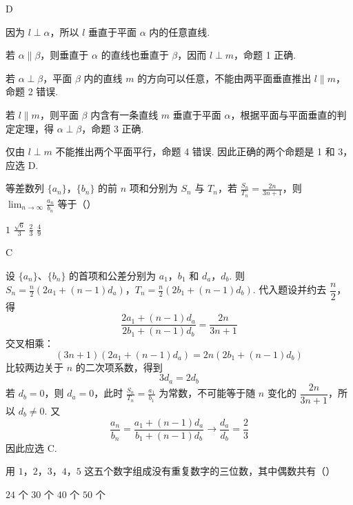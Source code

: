 \documentclass[UTF8,a4paper,oneside,11pt]{ctexbook}
\begin{document}
\begin{answer}
D
\end{answer}

\begin{solution}
因为 \(l\perp\alpha\)，所以 \(l\) 垂直于平面 \(\alpha\) 内的任意直线.

若 \(\alpha\parallel\beta\)，则垂直于 \(\alpha\) 的直线也垂直于 \(\beta\)，因而 \(l\perp m\)，命题 1 正确.

若 \(\alpha\perp\beta\)，平面 \(\beta\) 内的直线 \(m\) 的方向可以任意，不能由两平面垂直推出 \(l\parallel m\)，命题 2 错误.

若 \(l\parallel m\)，则平面 \(\beta\) 内含有一条直线 \(m\) 垂直于平面 \(\alpha\)，根据平面与平面垂直的判定定理，得 \(\alpha\perp\beta\)，命题 3 正确.

仅由 \(l\perp m\) 不能推出两个平面平行，命题 4 错误. 因此正确的两个命题是 1 和 3，应选 D.
\end{solution}

\begin{problem}
等差数列 \(\{a_{n}\}\)，\(\{b_{n}\}\) 的前 \(n\) 项和分别为 \(S_{n}\) 与 \(T_{n}\)，若 \(\frac{S_{n}}{T_{n}} = \frac{2n}{3n + 1}\)，则 \(\displaystyle\lim_{n\to \infty}\frac{a_n}{b_n}\) 等于（\quad）

\choices
    {\(1\)}
    {\(\frac{\sqrt{6}}{3} \)}
    {\(\frac{2}{3} \)}
    {\(\frac{4}{9} \)}
\end{problem}

\begin{answer}
C
\end{answer}

\begin{solution}
设 \(\{a_n\}\)、\(\{b_n\}\) 的首项和公差分别为 \(a_1\)，\(b_1\) 和 \(d_a\)，\(d_b\). 则 \(S_n=\frac n2\left(2a_1+(n-1)d_a\right)\)，\(T_n=\frac n2\left(2b_1+(n-1)d_b\right)\).
代入题设并约去 \(\dfrac n2\)，得
\[
\frac{2a_1+(n-1)d_a}{2b_1+(n-1)d_b}=\frac{2n}{3n+1}
\]
交叉相乘：
\[
(3n+1)\left(2a_1+(n-1)d_a\right)
=2n\left(2b_1+(n-1)d_b\right)
\]
比较两边关于 \(n\) 的二次项系数，得到
\[
3d_a=2d_b
\]
若 \(d_b=0\)，则 \(d_a=0\)，此时 \(\frac{S_n}{T_n}=\frac{a_1}{b_1}\) 为常数，不可能等于随 \(n\) 变化的 \(\dfrac{2n}{3n+1}\)，所以 \(d_b\ne0\). 又
\[
\frac{a_n}{b_n}
=\frac{a_1+(n-1)d_a}{b_1+(n-1)d_b}
\longrightarrow\frac{d_a}{d_b}
=\frac23
\]
因此应选 C.
\end{solution}

\begin{problem}
用 \(1\)，\(2\)，\(3\)，\(4\)，\(5\) 这五个数字组成没有重复数字的三位数，其中偶数共有（\quad）

\choices
    {\(24\) 个}
    {\(30\) 个}
    {\(40\) 个}
    {\(50\) 个}
\end{problem}
\end{document}
